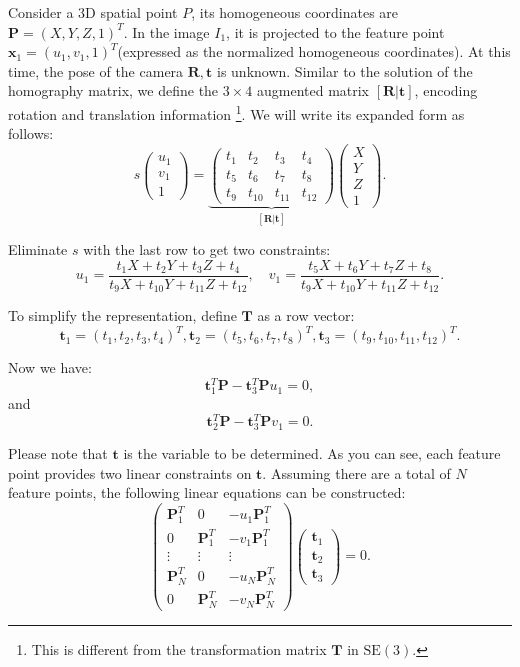 Consider a 3D spatial point $P$, its homogeneous coordinates are ${\mathbf{P}}=(X,Y,Z,1)^T$. In the image $I_{1}$, it is projected to the feature point ${\mathbf{x}}_{1}=(u_{1},v_{1},1)^T$(expressed as the normalized homogeneous coordinates). At this time, the pose of the camera $\mathbf{R}, \mathbf{t}$ is unknown. Similar to the solution of the homography matrix, we define the $3\times 4$ augmented matrix $[\mathbf{R}|\mathbf{t}]$, encoding rotation and translation information \footnote{This is different from the transformation matrix $\mathbf{T}$ in $\mathrm{SE}(3)$. }. We will write its expanded form as follows:
\begin{equation}
s
\begin{pmatrix}
u_{1} \\ v_{1} \\ 1
\end{pmatrix}
= \underbrace{
\begin{pmatrix}
t_{1} & t_{2} & t_{3} & t_{4}\\ 
t_{5} & t_{6} & t_{7} & t_{8}\\ 
t_{9} & t_{10} & t_{11} & t_{12}
\end{pmatrix}}_{[\mathbf{R}|\mathbf{t}]}
\begin{pmatrix}
X \\ Y \\ Z \\ 1
\end{pmatrix}.
\end{equation}

Eliminate $s$ with the last row to get two constraints:
\[
u_{1}=\frac{t_{1}X+t_{2}Y+t_{3}Z+t_{4}}{t_{9}X+t_{10}Y+t_{11}Z+t_{12}},\quad
v_{1}=\frac{t_{5}X+t_{6}Y+t_{7}Z+t_{8}}{t_{9}X+t_{10}Y+t_{11}Z+t_{12}}.
\]

To simplify the representation, define $\mathbf{T}$ as a row vector:
\[
\mathbf{t}_{1}=(t_{1},t_{2},t_{3},t_{4})^T,
\mathbf{t}_{2}=(t_{5},t_{6},t_{7},t_{8})^T,
\mathbf{t}_{3}=(t_{9},t_{10},t_{11},t_{12})^T.
\]

Now we have:
\[
\mathbf{t}_1^T\mathbf{P}-\mathbf{t}_3^T\mathbf{P} u_1=0,
\]
and
\[
\mathbf{t}_2^T\mathbf{P}-\mathbf{t}_3^T\mathbf{P} v_1=0.
\]

Please note that $\mathbf{t}$ is the variable to be determined. As you can see, each feature point provides two linear constraints on $\mathbf{t}$. Assuming there are a total of $N$ feature points, the following linear equations can be constructed:
\begin{equation}
\begin{pmatrix}
\mathbf{P}_{1}^T & 0 & -u_{1}\mathbf{P}_{1}^T	\\
0 & \mathbf{P}_{1}^T & -v_{1}\mathbf{P}_{1}^T	\\
\vdots & \vdots & \vdots			\\
\mathbf{P}_{N}^T & 0 & -u_{N}\mathbf{P}_{N}^T \\
0 & \mathbf{P}_{N}^T & -v_{N}\mathbf{P}_{N}^T
\end{pmatrix}
\begin{pmatrix}
\mathbf{t}_{1} \\ \mathbf{t}_{2} \\ \mathbf{t}_{3}
\end{pmatrix}
=0.
\end{equation}

